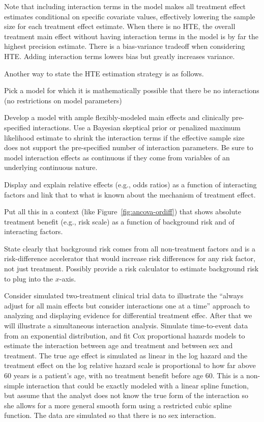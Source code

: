 Note that including interaction terms in the model makes all treatment
effect estimates conditional on specific covariate values, effectively
lowering the sample size for each treatment effect estimate.  When
there is no HTE, the overall treatment main effect without having interaction
terms in the model is by far the highest precision estimate.  There is
a bias-variance tradeoff when considering HTE.  Adding interaction
terms lowers bias but greatly increases variance.

Another way to state the HTE estimation strategy is as follows.
\be
\item Pick a model for which it is mathematically possible that there
  be no interactions (no restrictions on model parameters)
\item Develop a model with ample flexibly-modeled main effects and
  clinically pre-specified interactions.  Use a Bayesian skeptical
  prior or penalized maximum likelihood estimate to shrink the
  interaction terms if the effective sample size does not support the
  pre-specified number of interaction parameters.  Be sure to model
  interaction effects as continuous if they come from variables of an
  underlying continuous nature.
\item Display and explain relative effects (e.g., odds ratios) as a
  function of interacting factors and link that to what is known about
  the mechanism of treatment effect.
\item Put all this in a context (like Figure~\ref{fig:ancova-ordiff})
  that shows absolute treatment benefit (e.g., risk scale) as a
  function of background risk and of interacting factors.
\item State clearly that background risk comes from all non-treatment
  factors and is a risk-difference accelerator that would increase
  risk differences for any risk factor, not just treatment.  Possibly
  provide a risk calculator to estimate background risk to plug into
  the $x$-axis.
\ee

Consider simulated two-treatment clinical trial data to illustrate the ``always adjust for all main effects but consider interactions one at a time'' approach to analyzing and displaying evidence for differential treatment effec.  After that we will illustrate a simultaneous interaction analysis.  Simulate time-to-event data from an exponential distribution, and fit Cox proportional hazards models to estimate the interaction between age and treatment and between sex and treatment.  The true age effect is simulated as linear in the log hazard and the treatment effect on the log relative hazard scale is proportional to how far above 60 years is a patient's age, with no treatment benefit before age 60.  This is a non-simple interaction that could be exactly modeled with a linear spline function, but assume that the analyst does not know the true form of the interaction so she allows for a more general smooth form using a restricted cubic spline function.  The data are simulated so that there is no sex interaction.

